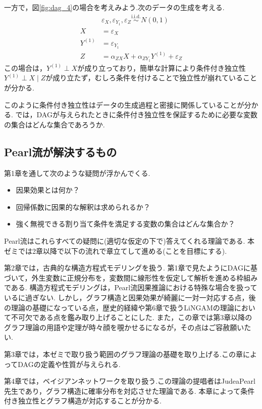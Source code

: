 \documentclass[uplatex, dvipdfmx]{jsarticle}
\begin{document}
一方で，図\ref{fig:dag_4}の場合を考えみよう.次のデータの生成を考える.
\begin{align}
  &\varepsilon_X, \varepsilon_{Y_1}, \varepsilon_Z \overset{\text{i.i.d.}}{\sim} N(0, 1) \\
  X &= \varepsilon_X \\
  Y^{(1)} &= \varepsilon_{Y_1} \\
  Z &= \alpha_{ZX}X + \alpha_{Z{Y_1}}Y^{(1)} + \varepsilon_Z 
\end{align}
この場合は，$Y^{(1)} \perp X$が成り立っており，簡単な計算により条件付き独立性$Y^{(1)} \perp X \mid Z$が成り立たず，むしろ条件を付けることで独立性が崩れていることが分かる.

このように条件付き独立性はデータの生成過程と密接に関係していることが分かる.
では，DAGが与えられたときに条件付き独立性を保証するために必要な変数の集合はどんな集合であろうか.

\newpage

\subsection{Pearl流が解決するもの}
第1章を通して次のような疑問が浮かんでくる.
\begin{itemize}
  \item 因果効果とは何か？
  \item 回帰係数に因果的な解釈は求められるか？
  \item 強く無視できる割り当て条件を満足する変数の集合はどんな集合か？
\end{itemize}
Pearl流はこれらすべての疑問に(適切な仮定の下で)答えてくれる理論である.
本ゼミでは2章以降で以下の流れで章立てして進める(ことを目標にする).

第2章では，古典的な構造方程式モデリングを扱う.
第1章で見たようにDAGに基づいて，外生変数に正規分布を，変数間に線形性を仮定して解析を進める枠組みである.
構造方程式モデリングは，Pearl流因果推論における特殊な場合を扱っているに過ぎない.
しかし，グラフ構造と因果効果が綺麗に一対一対応する点，後の理論の基礎になっている点，歴史的経緯や第6章で扱うLiNGAMの理論において不可欠である点を鑑み取り上げることにした.
また，この章では第3章以降のグラフ理論の用語や定理が時々顔を覗かせるになるが，その点はご容赦願いたい.

第3章では，本ゼミで取り扱う範囲のグラフ理論の基礎を取り上げる.この章によってDAGの定義や性質が与えられる.

第4章では，ベイジアンネットワークを取り扱う.この理論の提唱者はJudeaPearl先生であり，グラフ構造に確率分布を対応させた理論である.
本章によって条件付き独立性とグラフ構造が対応することが分かる.
\end{document}
